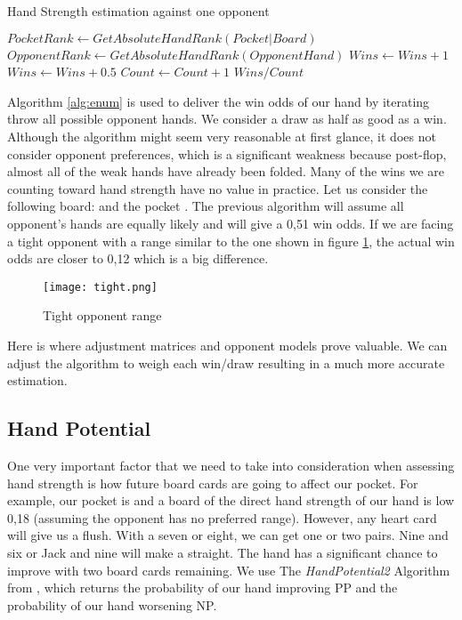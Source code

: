 \begin{Algorithmus}[H]
    \caption{Hand Strength estimation against one opponent}
    \label{alg:enum}
    \begin{algorithmic}
        \State $PocketRank \gets GetAbsoluteHandRank(Pocket | Board)$
            \State $OpponentRank \gets GetAbsoluteHandRank(OpponentHand)$
                \State $Wins \gets Wins + 1$
            \EndIf
                \State $Wins \gets Wins + 0.5$
            \EndIf
            \State $Count \gets Count + 1$
        \EndFor
        \State \Return $Wins / Count$
        \EndProcedure
    \end{algorithmic}
\end{Algorithmus}

Algorithm \ref{alg:enum} is used to deliver the win odds of our hand by iterating throw all possible opponent hands. We consider a draw as half as good as a win. Although the algorithm might seem very reasonable at first glance, it does not consider opponent preferences, which is a significant weakness because post-flop, almost all of the weak hands have already been folded. Many of the wins we are counting toward hand strength have no value in practice. Let us consider the following board:  and the pocket . The previous algorithm will assume all opponent's hands are equally likely and will give a 0,51 win odds. If we are facing a tight opponent with a range similar to the one shown in figure \ref{fig:tight}, the actual win odds are closer to 0,12 which is a big difference.

\begin{figure}[h]
    \centering
    \texttt{[image: tight.png]}
    \caption{Tight opponent range}
    \label{fig:tight}
\end{figure}

Here is where adjustment matrices and opponent models prove valuable. We can adjust the algorithm to weigh each win/draw resulting in a much more accurate estimation.

\subsection{Hand Potential}

One very important factor that we need to take into consideration when assessing hand strength is how future board cards are going to affect our pocket. For example, our pocket is  and a board of  the direct hand strength of our hand is low 0,18 (assuming the opponent has no preferred range). However, any heart card will give us a flush. With a seven or eight, we can get one or two pairs. Nine and six or Jack and nine will make a straight. The hand has a significant chance to improve with two board cards remaining.
We use The \textit{HandPotential2} Algorithm from \cite{papp_dealing_1998}, which returns the probability of our hand improving PP and the probability of our hand worsening NP.